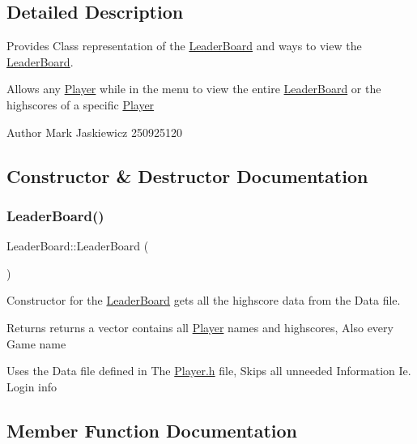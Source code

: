 \subsection{Detailed Description}
Provides Class representation of the \hyperlink{classLeaderBoard}{Leader\+Board} and ways to view the \hyperlink{classLeaderBoard}{Leader\+Board}. 

Allows any \hyperlink{classPlayer}{Player} while in the menu to view the entire \hyperlink{classLeaderBoard}{Leader\+Board} or the highscores of a specific \hyperlink{classPlayer}{Player} \begin{DoxyAuthor}{Author}
Mark Jaskiewicz 250925120 
\end{DoxyAuthor}


\subsection{Constructor \& Destructor Documentation}
\mbox{\label{classLeaderBoard_adc7b14c64cca2cddc9cb951f1d5779db}} 
\subsubsection{\texorpdfstring{Leader\+Board()}{LeaderBoard()}}
{\footnotesize\ttfamily Leader\+Board\+::\+Leader\+Board (\begin{DoxyParamCaption}{ }\end{DoxyParamCaption})}



Constructor for the \hyperlink{classLeaderBoard}{Leader\+Board} gets all the highscore data from the Data file. 

\begin{DoxyReturn}{Returns}
returns a vector contains all \hyperlink{classPlayer}{Player} names and highscores, Also every Game name
\end{DoxyReturn}
Uses the Data file defined in The \hyperlink{Player_8h_source}{Player.\+h} file, Skips all unneeded Information Ie. Login info 

\subsection{Member Function Documentation}
\mbox{\label{classLeaderBoard_abaa849f35f01657971f8962e9f754ef6}} 
